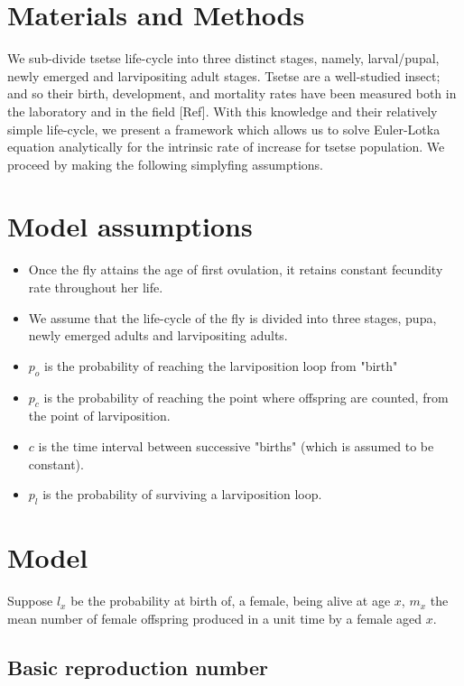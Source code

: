 \documentclass[10pt,a4paper]{article}
\begin{document}
\section*{Materials and Methods}
We sub-divide tsetse life-cycle into three distinct stages, namely, larval/pupal, newly emerged and larvipositing adult stages. Tsetse are a well-studied insect; and so their birth, development, and mortality rates have been measured both  in  the laboratory and  in the field [Ref]. With this knowledge and their relatively simple life-cycle, we present a framework which allows us to solve Euler-Lotka equation analytically for the intrinsic rate of increase for tsetse population. We proceed by making the following simplyfing  assumptions.   
\section*{Model assumptions} 
\begin{itemize} 
	\item  Once the fly attains the age of first ovulation, it retains constant fecundity rate throughout her life.   
	\item We assume that the life-cycle of the fly is divided into three stages, pupa, newly emerged adults and larvipositing adults. 
		\item  $p_o$ is the probability of reaching the larviposition loop from "birth"
	\item   $p_c$ is the probability of reaching the point where offspring are counted, from the point of larviposition.
	\item   $c$ is the time interval between successive "births" (which is assumed to be constant). 
	\item   $p_l$ is the probability of surviving a larviposition loop.
\end{itemize}


\section*{Model} 

Suppose  $l_{x}$ be the probability at birth of, a female, being alive at age $x$, $m_{x}$ the mean number of female offspring produced in a unit time by a female aged $x$.  




\subsection*{Basic reproduction number}
\end{document}
